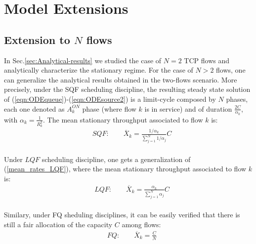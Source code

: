 \documentclass[a4paper,oneside, 11pt]{article}
\begin{document}
\section{Model Extensions}\label{sec:extensions}
\subsection{Extension to $N$ flows}
In Sec.\ref{sec:Analytical-results} we studied the case of $N=2$ TCP flows and analytically characterize
the stationary regime. For the case of $N>2$ flows,
one can generalize the analytical results obtained in the two-flows scenario.
More precisely, under the SQF scheduling discipline, the resulting steady state
solution of (\ref{eqn:ODEqueue})-(\ref{eqn:ODEsource2}) is a limit-cycle
composed by $N$ phases,
each one denoted as $A_k^{ON}$ phase (where flow $k$ is in service) and of duration $\frac{2C}{\alpha_k}$, with $\alpha_k=\frac{1}{R_k^2}$.
The mean stationary throughput associated to flow $k$ is:
\begin{align}\label{SQF_N_flows_X}
 \quad SQF: \qquad \overline{X}_k=\frac{1/\alpha_k}{\sum_{j=1}^{N} 1/\alpha_j}C
\end{align}
\\Under $LQF$ scheduling discipline, one gets a generalization of (\ref{mean_rates_LQF}), where the mean stationary throughput associated to flow $k$ is:\\
\begin{align}\label{LQF_N_flows_X}
 \quad LQF: \qquad \overline{X}_k=\frac{\alpha_k}{\sum_{j=1}^N \alpha_j}C
\end{align}
\\Similary, under FQ sheduling disciplines, it can be easily verified that there is still a fair allocation of the capacity $C$ among flows:\\
\begin{align}\label{FQ_N_flows_X}
 \quad FQ: \qquad \overline{X}_k=\frac{C}{N}
\end{align}
\end{document}
